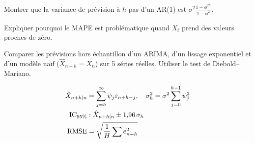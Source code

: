 \begin{exercice}[$\star\star$]
Montrer que la variance de pr\'evision \`a $h$ pas d'un AR(1) est $\sigma^2\frac{1-\phi^{2h}}{1-\phi^2}$.
\end{exercice}

\begin{exercice}[$\star\star$]
Expliquer pourquoi le MAPE est probl\'ematique quand $X_t$ prend des valeurs proches de z\'ero.
\end{exercice}

\begin{exercice}
Comparer les pr\'evisions hors \'echantillon d'un ARIMA, d'un lissage exponentiel et d'un mod\`ele na\"if ($\hat{X}_{n+h}=X_n$) sur 5 s\'eries r\'eelles. Utiliser le test de Diebold--Mariano.
\end{exercice}

\begin{formules}
\begin{align*}
\hat{X}_{n+h|n} &= \sum_{j=h}^{\infty}\psi_j\varepsilon_{n+h-j}, \quad \sigma_h^2=\sigma^2\sum_{j=0}^{h-1}\psi_j^2 \\
\text{IC}_{95\%} &: \hat{X}_{n+h|n}\pm 1{,}96\,\sigma_h \\
\text{RMSE} &= \sqrt{\frac{1}{H}\sum e_{n+h}^2}
\end{align*}
\end{formules}
